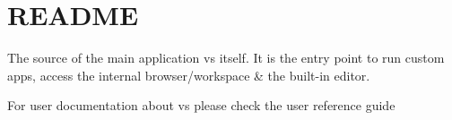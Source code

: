 \chapter{README}
\hypertarget{md_src_2app_2README}{}\label{md_src_2app_2README}
The source of the main application {\ttfamily vs} itself. It is the entry point to run custom apps, access the internal browser/workspace \& the built-\/in editor.

For user documentation about {\ttfamily vs} please check the user reference guide 